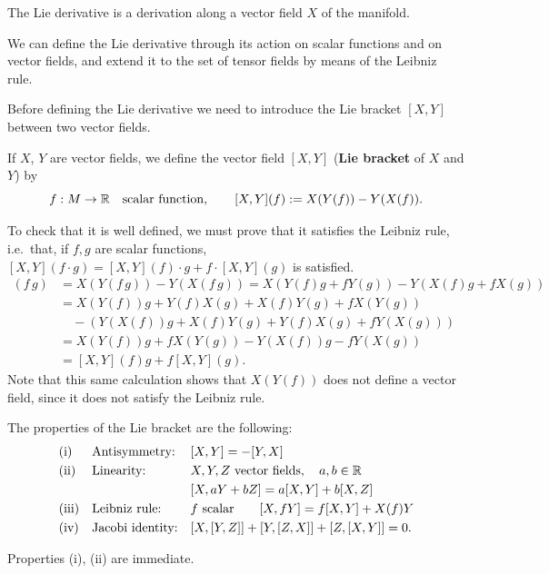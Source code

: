 \begin{points}
\item The Lie derivative is a derivation along a vector field $X$ of the manifold.

\item We can define the Lie derivative through its action on scalar functions and on vector fields, and extend it to the set of tensor fields by means of the Leibniz rule.

\item Before defining the Lie derivative we need to introduce the Lie bracket $[X,Y]$ between two vector fields.

\item If $X$, $Y$ are vector fields, we define the vector field $[X,Y]$ (\textbf{Lie bracket} of $X$ and $Y$) by
\[
  f:M\to\mathbb{R}\quad\text{scalar function},\qquad[X,Y](f):=X(Y(f))-Y(X(f)).
\]

\item To check that it is well defined, we must prove that it satisfies the Leibniz rule, i.e.\ that, if $f,g$ are scalar functions, $[X,Y](f\cdot g)=[X,Y](f)\cdot g+f\cdot[X,Y](g)$ is satisfied.
\begin{align*}
  [X,Y](f\,g)&=X(Y(f\,g))-Y(X(f\,g))=X(Y(f)g+fY(g))-Y(X(f)g+fX(g))\\
  &=X(Y(f))g+Y(f)X(g)+X(f)Y(g)+fX(Y(g))\\
  &\quad-(Y(X(f))g+X(f)Y(g)+Y(f)X(g)+fY(X(g)))\\
  &=X(Y(f))g+fX(Y(g))-Y(X(f))g-fY(X(g))\\
  &=[X,Y](f)g+f[X,Y](g).
\end{align*}
Note that this same calculation shows that $X(Y(f))$ does not define a vector field, since it does not satisfy the Leibniz rule.

\item The properties of the Lie bracket are the following:
\begin{align*}
  &\text{(i)}&&\text{Antisymmetry:}&&[X,Y]=-[Y,X]\\
  &\text{(ii)}&&\text{Linearity:}&&X,Y,Z\text{ vector fields},\quad a,b\in\mathbb{R}\\
  &&&&&[X,aY+bZ]=a[X,Y]+b[X,Z]\\
  &\text{(iii)}&&\text{Leibniz rule:}&&f\text{ scalar}\qquad[X,fY]=f[X,Y]+X(f)Y\\
  &\text{(iv)}&&\text{Jacobi identity:}&&[X,[Y,Z]]+[Y,[Z,X]]+[Z,[X,Y]]=0.
\end{align*}

\item Properties (i), (ii) are immediate.


\end{points}
